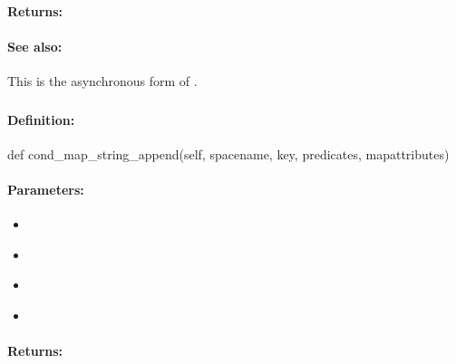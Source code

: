 \paragraph{Returns:}


\paragraph{See also:}  This is the asynchronous form of .

\pagebreak
\subsubsection{}
\label{api:python:cond_map_string_append}


\paragraph{Definition:}
\begin{pythoncode}
def cond_map_string_append(self, spacename, key, predicates, mapattributes)
\end{pythoncode}

\paragraph{Parameters:}
\begin{itemize}[noitemsep]
\item {}\\

\item {}\\

\item {}\\

\item {}\\

\end{itemize}

\paragraph{Returns:}


